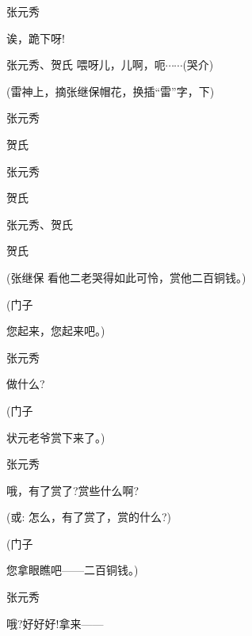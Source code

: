 张元秀\hspace{20pt}~

诶，跪下呀!

张元秀、贺氏 喂呀儿，儿啊，呃$\cdots{}\cdots{}$(哭介)

(雷神上，摘张继保帽花，换插``雷''字，下)

张元秀\hspace{20pt}~


贺氏\hspace{30pt}~


张元秀\hspace{20pt}~


贺氏\hspace{30pt}~


张元秀、贺氏


{贺氏\hspace{30pt}~

 }

{(张继保 看他二老哭得如此可怜，赏他二百铜钱。)}

{(门子\hspace{30pt}~

您起来，您起来吧。)}

{张元秀\hspace{20pt}~

做什么?}

{(门子\hspace{30pt}~

状元老爷赏下来了。)}

{张元秀\hspace{20pt}~

哦，有了赏了?赏些什么啊?}({\akai 或}: 怎么，有了赏了，赏的什么?)

{(门子\hspace{30pt}~

您拿眼瞧吧------二百铜钱。)}

{张元秀\hspace{20pt}~

哦?好好好!拿来------}

